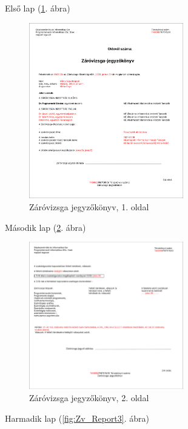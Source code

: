 \documentclass[a4paper,12pt]{article}
\begin{document}
Első lap (\ref{fig:Zv_Report1}. ábra)

\begin{figure}[h!]
	\centering
	\includegraphics[width=0.6\textwidth]{images/Web_pages/Zv_Report1.png}
	\caption{Záróvizsga jegyzőkönyv, 1. oldal}
	\label{fig:Zv_Report1}
\end{figure}

Második lap (\ref{fig:Zv_Report2}. ábra)

\begin{figure}[h!]
	\centering
	\includegraphics[width=0.6\textwidth]{images/Web_pages/Zv_Report2.png}
	\caption{Záróvizsga jegyzőkönyv, 2. oldal}
	\label{fig:Zv_Report2}
\end{figure}

Harmadik lap (\ref{fig:Zv_Report3}. ábra)
\end{document}
